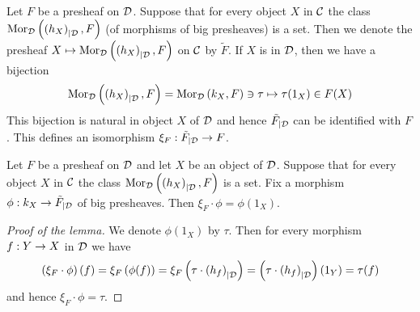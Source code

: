 \noindent
Let $F$ be a presheaf on ${\mathcal D}$. Suppose that for every object $X$ in ${\mathcal C}$ the class $\mathrm{Mor}_{{\mathcal D}}\left(\left(h_X\right)_{\mid {\mathcal D}},F\right)$ (of morphisms of big presheaves) is a set. Then we denote the presheaf $X\mapsto \mathrm{Mor}_{{\mathcal D}}\left(\left(h_X\right)_{\mid {\mathcal D}},F\right)$ on ${\mathcal C}$ by $\tilde{F}$. If $X$ is in ${\mathcal D}$, then we have a bijection
$$\mathrm{Mor}_{{\mathcal D}}\left(\left(h_X\right)_{\mid {\mathcal D}},F\right) = \mathrm{Mor}_{{\mathcal D}}\left(k_X , F\right)\ni \tau \mapsto \tau(1_X)\in F(X)$$
This bijection is natural in object $X$ of ${\mathcal D}$ and hence $\tilde{F}_{\mid {\mathcal D}}$ can be identified with $F$. This defines an isomorphism $\xi_F:\tilde{F}_{\mid {\mathcal D}}\rightarrow F$.

\begin{lemma}\label{lemma:counitandsection}
Let $F$ be a presheaf on ${\mathcal D}$ and let $X$ be an object of ${\mathcal D}$. Suppose that for every object $X$ in ${\mathcal C}$ the class $\mathrm{Mor}_{{\mathcal D}}\left(\left(h_X\right)_{\mid {\mathcal D}},F\right)$ is a set. Fix a morphism $\phi:k_X\rightarrow \tilde{F}_{\mid {\mathcal D}}$ of big presheaves. Then $\xi_F\cdot \phi = \phi(1_X)$.
\end{lemma}
\begin{proof}[Proof of the lemma]
We denote $\phi(1_X)$ by $\tau$. Then for every morphism $f:Y\rightarrow X$ in ${\mathcal D}$ we have
$$\left(\xi_{F}\cdot \phi\right)(f) = \xi_F\left(\phi(f)\right) = \xi_F\left(\tau\cdot \left(h_f\right)_{\mid {\mathcal D}}\right) = \left(\tau\cdot \left(h_f\right)_{\mid {\mathcal D}}\right)(1_Y) = \tau(f)$$
and hence $\xi_F\cdot \phi = \tau$.
\end{proof}

